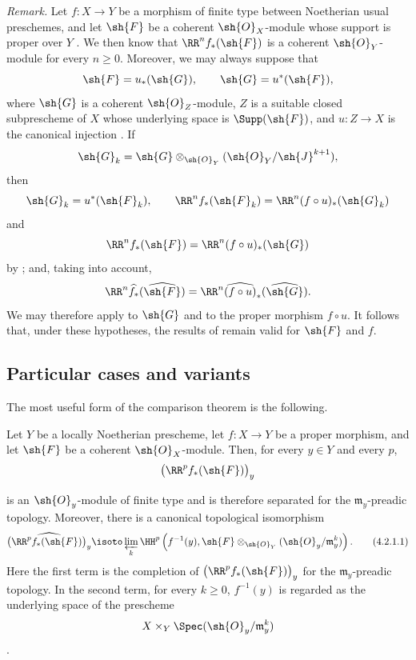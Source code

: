 \begin{env}[4.1.10]
\label{III.4.1.10}
\emph{Remark.}
Let $f:X\to Y$ be a morphism of finite type between Noetherian usual
preschemes, and let $\sh{F}$ be a coherent $\sh{O}_X$-module whose
support is proper over $Y$ .
We then know  that $\RR^n f_*(\sh{F})$ is a coherent
$\sh{O}_Y$-module for every $n\geq0$.
Moreover, we may always suppose that
\[
  \sh{F}=u_*(\sh{G}),
  \qquad
  \sh{G}=u^*(\sh{F}),
\]
where $\sh{G}$ is a coherent $\sh{O}_Z$-module, $Z$ is a suitable
closed subprescheme of $X$ whose underlying space is
$\Supp(\sh{F})$, and $u:Z\to X$ is the canonical injection
.
If
\[
  \sh{G}_k
  =
  \sh{G}\otimes_{\sh{O}_Y}
  (\sh{O}_Y/\sh{J}^{k+1}),
\]
then
\[
  \sh{G}_k=u^*(\sh{F}_k),
  \qquad
  \RR^n f_*(\sh{F}_k)
  =
  \RR^n(f\circ u)_*(\sh{G}_k)
\]
and
\[
  \RR^n f_*(\sh{F})
  =
  \RR^n(f\circ u)_*(\sh{G})
\]
by ; and, taking  into account,
\[
  \RR^n\widehat{f}_*(\widehat{\sh{F}})
  =
  \RR^n\widehat{(f\circ u)}_*(\widehat{\sh{G}}).
\]
We may therefore apply  to $\sh{G}$ and to the proper
morphism $f\circ u$.
It follows that, under these hypotheses, the results of
 remain valid for $\sh{F}$ and $f$.
\end{env}


\subsection{Particular cases and variants}
\label{subsection:III.4.2}

The most useful form of the comparison theorem  is
the following.

\begin{proposition}[4.2.1]
\label{III.4.2.1}
Let $Y$ be a locally Noetherian prescheme, let $f:X\to Y$ be a
proper morphism, and let $\sh{F}$ be a coherent $\sh{O}_X$-module.
Then, for every $y\in Y$ and every $p$,
\[
  \bigl(\RR^p f_*(\sh{F})\bigr)_y
\]


is an $\sh{O}_y$-module of finite type and is therefore separated
for the $\mathfrak{m}_y$-preadic topology.
Moreover, there is a canonical topological isomorphism
\[
  \widehat{\bigl(\RR^p f_*(\sh{F})\bigr)_y}
  \isoto
  \varprojlim_k
  \HH^p\left(
    f^{-1}(y),
    \sh{F}\otimes_{\sh{O}_Y}
    (\sh{O}_y/\mathfrak{m}_y^k)
  \right).
  \tag{4.2.1.1}
  \label{III.4.2.1.1}
\]
Here the first term is the completion of
$\bigl(\RR^p f_*(\sh{F})\bigr)_y$ for the
$\mathfrak{m}_y$-preadic topology.
In the second term, for every $k\geq0$, $f^{-1}(y)$ is regarded as
the underlying space of the prescheme
\[
  X\times_Y\Spec(\sh{O}_y/\mathfrak{m}_y^k)
\]
.
\end{proposition}

